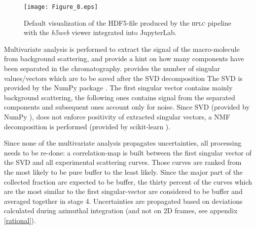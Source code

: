 \documentclass[preprint]{iucr}              %
\begin{document}
\begin{figure}
\label{hplc}
\begin{center}
\texttt{[image: Figure\_8.eps]}
\caption{Default visualization of the HDF5-file produced by the \textsc{hplc} pipeline with the \textit{h5web} viewer integrated into JupyterLab.}
\end{center}
\end{figure}

Multivariate analysis is performed to extract the signal of the macro-molecule from background scattering, and provide a hint on how many components have been separated in the chromatography.
 provides the number of singular values/vectors which are to be saved after the SVD decomposition
The SVD is provided by the NumPy package \cite{numpy}.   
The first singular vector contains mainly background scattering, the following ones contains signal from the separated components and subsequent ones account only for noise.
Since SVD (provided by NumPy \cite{numpy}), does not enforce positivity of extracted singular vectors, a NMF decomposition is performed (provided by scikit-learn \cite{sklearn}).


Since none of the multivariate analysis propagates uncertainties, all processing needs to be re-done:
a correlation-map is built between the first singular vector of the SVD and all experimental scattering curves. 
Those curves are ranked from the most likely to be pure buffer to the least likely. 
Since the major part of the collected fraction are expected to be buffer, the thirty percent of the curves which are the most similar to the first singular-vector are considered to be buffer and averaged together in stage 4.
Uncertainties are propagated based on deviations calculated during azimuthal integration (and not on 2D frames, see appendix \ref{rational}).
\end{document}
